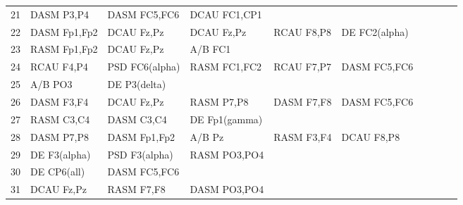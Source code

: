 \begin{landscape}
\begin{table}[]
\begin{tabular}{l|llllllll}
21       & DASM P3,P4     & DASM FC5,FC6   & DCAU FC1,CP1   &                &                &                &               &                &               &               \\
22       & DASM Fp1,Fp2   & DCAU Fz,Pz     & DCAU Fz,Pz     & RCAU F8,P8     & DE FC2(alpha)  &                &               &                &               &               \\
23       & RASM Fp1,Fp2   & DCAU Fz,Pz     & A/B FC1        &                &                &                &               &                &               &               \\
24       & RCAU F4,P4     & PSD FC6(alpha) & RASM FC1,FC2   & RCAU F7,P7     & DASM FC5,FC6   &                &               &                &               &               \\
25       & A/B PO3        & DE P3(delta)   &                &                &                &                &               &                &               &               \\
26       & DASM F3,F4     & DCAU Fz,Pz     & RASM P7,P8     & DASM F7,F8     & DASM FC5,FC6   &                &               &                &               &               \\
27       & RASM C3,C4     & DASM C3,C4     & DE Fp1(gamma)  &                &                &                &               &                &               &               \\
28       & DASM P7,P8     & DASM Fp1,Fp2   & A/B Pz         & RASM F3,F4     & DCAU F8,P8     &                &               &                &               &               \\
29       & DE F3(alpha)   & PSD F3(alpha)  & RASM PO3,PO4   &                &                &                &               &                &               &               \\
30       & DE CP6(all)    & DASM FC5,FC6   &                &                &                &                &               &                &               &               \\
31       & DCAU Fz,Pz     & RASM F7,F8     & DASM PO3,PO4   &                &                &                &               &                &               &               \\
\end{tabular}
\end{table}
\end{landscape}
\clearpage
